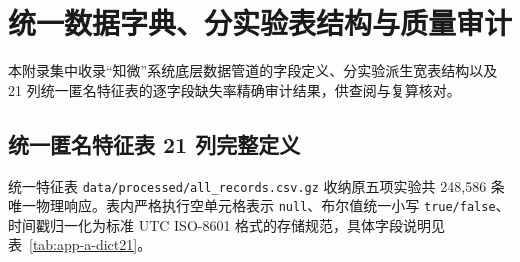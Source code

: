 \chapter{统一数据字典、分实验表结构与质量审计}\label{app:db}

本附录集中收录“知微”系统底层数据管道的字段定义、分实验派生宽表结构以及 21 列统一匿名特征表的逐字段缺失率精确审计结果，供查阅与复算核对。

\section{统一匿名特征表 21 列完整定义}

统一特征表 \texttt{data/processed/all\_records.csv.gz} 收纳原五项实验共 248,586 条唯一物理响应。表内严格执行空单元格表示 \texttt{null}、布尔值统一小写 \texttt{true/false}、时间戳归一化为标准 UTC ISO-8601 格式的存储规范，具体字段说明见表~\ref{tab:app-a-dict21}。

